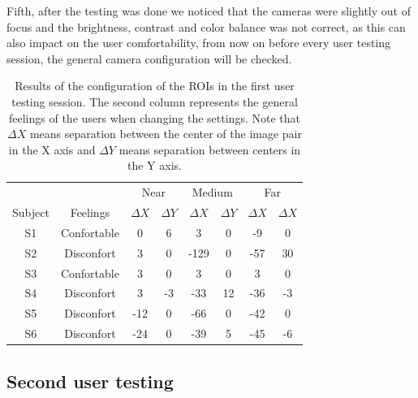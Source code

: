 \documentclass[10pt,a4paper,twocolumn,twoside]{article}
\begin{document}
	Fifth, after the testing was done we noticed that the cameras were slightly out of focus and the brightness, contrast and color balance was not correct, as this can also impact on the user comfortability, from now on before every user testing session, the general camera configuration will be checked.
	
	
	\begin{table}
		\begin{center}
			\begin{tabular}{cccccccc}
				\toprule
				& & \multicolumn{2}{c}{Near} & \multicolumn{2}{c}{Medium} & \multicolumn{2}{c}{Far} \\ 
				Subject &Feelings & $\Delta X$ & $\Delta Y$ & $\Delta X$ & $\Delta Y$ & $\Delta X$ & $\Delta X$ \\ 
				\midrule
				S1&Confortable & 0 & 6 & 3 & 0 & -9 & 0 \\ 
				\midrule 
				S2&Disconfort & 3 & 0 & -129 & 0 & -57 & 30 \\ 
				\midrule
				S3&Confortable & 3 & 0 & 3 & 0 & 3 & 0 \\ 
				\midrule 
				S4&Disconfort & 3 & -3 & -33 & 12 & -36 & -3 \\ 
				\midrule
				S5&Disconfort & -12 & 0 & -66 & 0 & -42 & 0 \\ 
				\midrule
				S6&Disconfort & -24 & 0 & -39 & 5 & -45 & -6 \\ 
				\bottomrule
			\end{tabular} 
			\caption{Results of the configuration of the ROIs in the first user testing session. The second column represents the general feelings of the users when changing the settings. Note that $\Delta X$ means separation between the center of the image pair in the X axis and $\Delta Y$ means separation between centers in the Y axis.}
			\label{tab:firstUserTestResults}
		\end{center}
	\end{table}
	
	
	\subsection{Second user testing}
	
\end{document}
